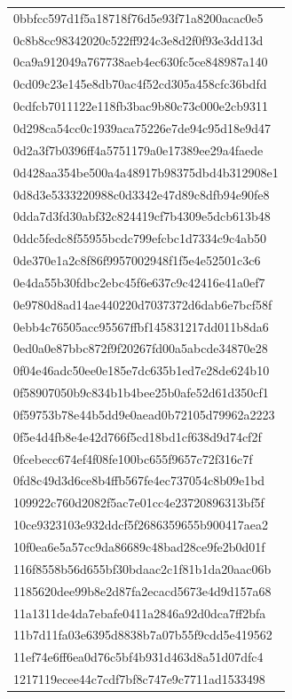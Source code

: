 \begin{tabular}{l}
0bbfcc597d1f5a18718f76d5e93f71a8200acac0e5 \\
0c8b8cc98342020c522ff924c3e8d2f0f93e3dd13d \\
0ca9a912049a767738aeb4ec630fc5ce848987a140 \\
0cd09c23e145e8db70ac4f52cd305a458cfc36bdfd \\
0cdfcb7011122e118fb3bac9b80c73c000e2cb9311 \\
0d298ca54cc0c1939aca75226e7de94c95d18e9d47 \\
0d2a3f7b0396ff4a5751179a0e17389ee29a4faede \\
0d428aa354be500a4a48917b98375dbd4b312908e1 \\
0d8d3e5333220988c0d3342e47d89c8dfb94e90fe8 \\
0dda7d3fd30abf32c824419cf7b4309e5dcb613b48 \\
0ddc5fedc8f55955bcdc799efcbc1d7334c9c4ab50 \\
0de370e1a2c8f86f9957002948f1f5e4e52501c3c6 \\
0e4da55b30fdbc2ebc45f6e637c9c42416e41a0ef7 \\
0e9780d8ad14ae440220d7037372d6dab6e7bcf58f \\
0ebb4c76505acc95567ffbf145831217dd011b8da6 \\
0ed0a0e87bbc872f9f20267fd00a5abcde34870e28 \\
0f04e46adc50ee0e185e7dc635b1ed7e28de624b10 \\
0f58907050b9c834b1b4bee25b0afe52d61d350cf1 \\
0f59753b78e44b5dd9e0aead0b72105d79962a2223 \\
0f5e4d4fb8e4e42d766f5cd18bd1cf638d9d74cf2f \\
0fcebecc674ef4f08fe100bc655f9657c72f316c7f \\
0fd8c49d3d6ce8b4ffb567fe4ec737054c8b09e1bd \\
109922c760d2082f5ac7e01cc4e23720896313bf5f \\
10ce9323103e932ddcf5f2686359655b900417aea2 \\
10f0ea6e5a57cc9da86689c48bad28ce9fe2b0d01f \\
116f8558b56d655bf30bdaac2c1f81b1da20aac06b \\
1185620dee99b8e2d87fa2ecacd5673e4d9d157a68 \\
11a1311de4da7ebafe0411a2846a92d0dca7ff2bfa \\
11b7d11fa03e6395d8838b7a07b55f9cdd5e419562 \\
11ef74e6ff6ea0d76c5bf4b931d463d8a51d07dfc4 \\
1217119ecee44c7cdf7bf8c747e9c7711ad1533498 \\

\end{tabular}
